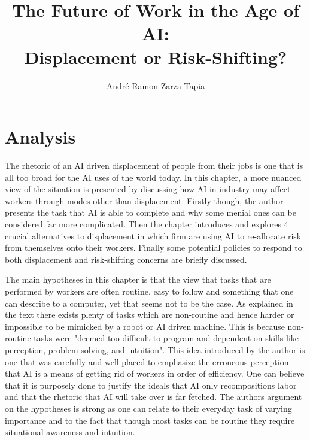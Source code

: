 \documentclass[a4paper,11pt,oneside]{report}
\title{The Future of Work in the Age of AI:\\ Displacement or Risk-Shifting?}
\author{André Ramon Zarza Tapia}
\begin{document}
\maketitle



\chapter{Analysis}

The rhetoric of an AI driven displacement of people from their jobs is one that is all too broad for the AI uses of the world today. In this chapter, a more nuanced view of the situation is presented by discussing how AI in industry may affect workers through modes other than displacement. Firstly though, the author presents the task that AI is able to complete and why some menial ones can be considered far more complicated. Then the chapter introduces and explores 4 crucial alternatives to displacement in which firm are using AI to re-allocate risk from themselves onto their workers. Finally some potential policies to respond to both displacement and risk-shifting concerns are briefly discussed.

The main hypotheses in this chapter is that the view that tasks that are performed by workers are often routine, easy to follow and something that one can describe to a computer, yet that seems not to be the case. As explained in the text there exists plenty of tasks which are non-routine and hence harder or impossible to be mimicked by a robot or AI driven machine. This is because non-routine tasks were "deemed too difficult to program and dependent on skills like perception, problem-solving, and intuition". This idea introduced by the author is one that was carefully and well placed to emphasize the erroneous perception that AI is a means of getting rid of workers in order of efficiency. One can believe that it is purposely done to justify the ideals that AI only recompositions labor and that the rhetoric that AI will take over is far fetched. The authors argument on the hypotheses is strong as one can relate to their everyday task of varying importance and to the fact that though most tasks can be routine they require situational awareness and intuition.
\end{document}
